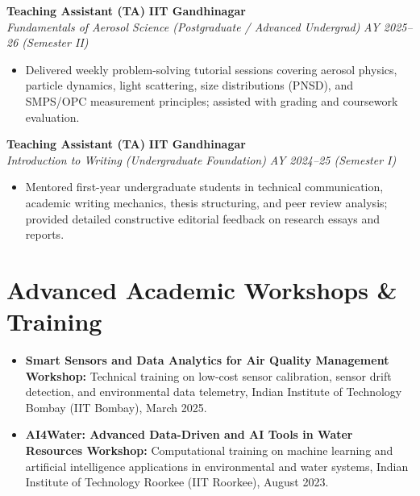 \documentclass[10pt,a4paper]{article}
\newcommand{\entryheader}[4]{
    \noindent\textbf{#1} \hfill \textbf{\color{subtext}#2} \\
    \textit{#3} \hfill \textit{\color{subtext}#4}
    \vspace{1.5pt}
}
\begin{document}
\entryheader{Teaching Assistant (TA)}{IIT Gandhinagar}{Fundamentals of Aerosol Science (Postgraduate / Advanced Undergrad)}{AY 2025--26 (Semester II)}
\begin{itemize}
    \item Delivered weekly problem-solving tutorial sessions covering aerosol physics, particle dynamics, light scattering, size distributions (PNSD), and SMPS/OPC measurement principles; assisted with grading and coursework evaluation.
\end{itemize}
\vspace{3pt}

\entryheader{Teaching Assistant (TA)}{IIT Gandhinagar}{Introduction to Writing (Undergraduate Foundation)}{AY 2024--25 (Semester I)}
\begin{itemize}
    \item Mentored first-year undergraduate students in technical communication, academic writing mechanics, thesis structuring, and peer review analysis; provided detailed constructive editorial feedback on research essays and reports.
\end{itemize}

\section{Advanced Academic Workshops \& Training}
\begin{itemize}
    \item \textbf{Smart Sensors and Data Analytics for Air Quality Management Workshop:} Technical training on low-cost sensor calibration, sensor drift detection, and environmental data telemetry, Indian Institute of Technology Bombay (IIT Bombay), March 2025.
    \item \textbf{AI4Water: Advanced Data-Driven and AI Tools in Water Resources Workshop:} Computational training on machine learning and artificial intelligence applications in environmental and water systems, Indian Institute of Technology Roorkee (IIT Roorkee), August 2023.
\end{itemize}

\end{document}
